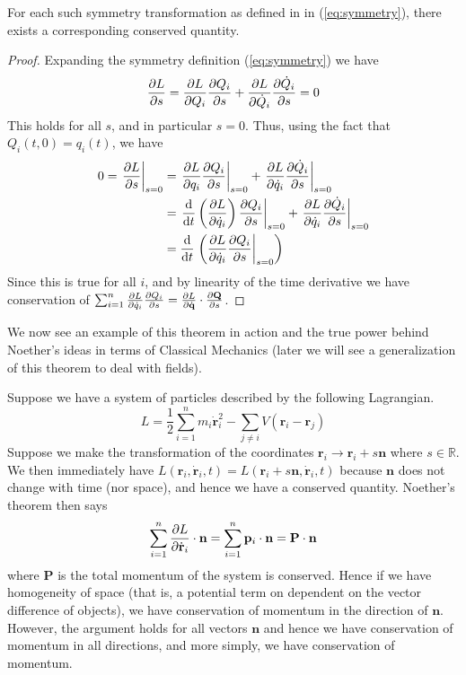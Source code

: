 \begin{theorem}\label{noetherian}
    For each such symmetry transformation as defined in in (\ref{eq:symmetry}),
    there exists a corresponding conserved quantity.
\end{theorem}
\begin{proof}
    Expanding the symmetry definition (\ref{eq:symmetry}) we have
    \begin{equation}
        \pdv{L}{s} = \pdv{L}{Q_i}\pdv{Q_i}{s} + \pdv{L}{\dot{Q}_i}\pdv{\dot{Q}_i}{s} = 0
    \end{equation}
    This holds for all \(s\), and in particular \(s = 0\). Thus, using the fact
    that \(Q_i(t,0) = q_i(t)\), we have
    \begin{align}
        0 = \left.\pdv{L}{s}\right|_{s = 0} & = \left.\pdv{L}{q_i}\pdv{Q_i}{s}\right|_{s = 0} + \left.\pdv{L}{\dot{q}_i}\pdv{\dot{Q}_i}{s}\right|_{s = 0}                          \\
                                            & = \left.\dv{t}\left(\pdv{L}{\dot{q}_i}\right)\pdv{Q_i}{s}\right|_{s = 0} + \left.\pdv{L}{\dot{q}_i}\pdv{\dot{Q}_i}{s}\right|_{s = 0} \\
                                            & = \dv{t}\left.\left(\pdv{L}{\dot{q}_i}\pdv{Q_i}{s}\right|_{s = 0}\right)
    \end{align}
    Since this is true for all \(i\), and by linearity of the time derivative we
    have conservation of \(\sum_{i = 1}^n \pdv{L}{\dot{q}_i}\pdv{Q_i}{s} = \pdv{L}{\dot{\mathbf{q}}}\cdot\pdv{\mathbf{Q}}{s}\).
\end{proof}
We now see an example of this theorem in action and the true power behind
Noether's ideas in terms of Classical Mechanics (later we will see a
generalization of this theorem to deal with fields).
\begin{example}\label{momcons}
    Suppose we have a system of particles described by the following Lagrangian.
    \begin{equation}
        L = \frac{1}{2}\sum_{i = 1}^n m_i\dot{\mathbf{r}}_i^2 - \sum_{j\neq i}V(\mathbf{r}_i - \mathbf{r}_j)
    \end{equation}
    Suppose we make the transformation of the coordinates \(\mathbf{r}_i\to \mathbf{r}_i + s\mathbf{n}\) where \(s\in\mathbb{R}\). We then immediately have \(L(\mathbf{r}_i, \dot{\mathbf{r}}_i, t) = L(\mathbf{r}_i + s\mathbf{n}, \dot{\mathbf{r}}_i, t)\) because \(\mathbf{n}\) does not change with time (nor space), and hence we have a conserved quantity. Noether's theorem then says
    \begin{equation}
        \sum_{i = 1}^n\pdv{L}{\dot{\mathbf{r}}_i}\cdot\mathbf{n} = \sum_{i = 1}^n \mathbf{p}_i\cdot\mathbf{n} = \mathbf{P}\cdot\mathbf{n}
    \end{equation}
    where \(\mathbf{P}\) is the total momentum of the system is conserved. Hence
    if we have homogeneity of space (that is, a potential term on dependent on the
    vector difference of objects), we have conservation of momentum in the direction
    of \(\mathbf{n}\). However, the argument holds for all vectors \(\mathbf{n}\)
    and hence we have conservation of momentum in all directions, and more simply,
    we have conservation of momentum.
\end{example}
